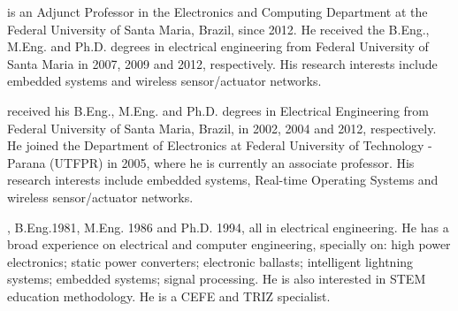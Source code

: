 \documentclass[final,authoryear,3p,twocolumn]{elsarticle}
\begin{document}

\newpage

 is an Adjunct Professor in the Electronics and Computing Department at the Federal University of Santa Maria, Brazil, since 2012. He received the B.Eng., M.Eng. and Ph.D. degrees in electrical engineering from Federal University of Santa Maria in 2007, 2009 and 2012, respectively. His research interests include embedded systems and wireless sensor/actuator networks.\newline

received his B.Eng., M.Eng. and Ph.D. degrees in Electrical Engineering from Federal University of Santa Maria, Brazil, in 2002, 2004 and 2012, respectively. He joined the Department of Electronics at Federal University of Technology - Parana (UTFPR) in 2005, where he is currently an associate professor. His research interests include embedded systems, Real-time Operating Systems and wireless sensor/actuator networks.\newline

, B.Eng.1981, M.Eng. 1986 and Ph.D. 1994, all in electrical engineering. He has a broad experience on electrical and computer engineering, specially on: high power electronics; static power converters; electronic ballasts; intelligent lightning systems; embedded systems; signal processing. He is also interested in STEM education methodology. He is a CEFE and TRIZ specialist.
\end{document}
